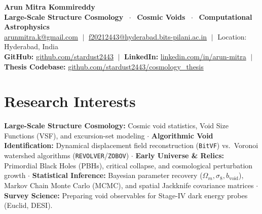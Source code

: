 \documentclass[10pt,a4paper]{article}
\begin{document}
\begin{center}
    {\LARGE\bfseries\color{primarynavy} Arun Mitra Kommireddy} \\[2.5pt]
    {\normalsize\color{secondaryslate}\textbf{Large-Scale Structure Cosmology $\;\cdot\;$ Cosmic Voids $\;\cdot\;$ Computational Astrophysics}} \\[4pt]
    
    {\small
    \href{mailto:arunmitra.k@gmail.com}{arunmitra.k@gmail.com} $\;\vert\;$ 
    \href{mailto:f20212443@hyderabad.bits-pilani.ac.in}{f20212443@hyderabad.bits-pilani.ac.in} $\;\vert\;$ 
    Location: Hyderabad, India
    } \\[1.5pt]
    {\small
    \textbf{GitHub:} \href{https://github.com/stardust2443}{github.com/stardust2443} $\;\vert\;$ 
    \textbf{LinkedIn:} \href{https://linkedin.com/in/arun-mitra}{linkedin.com/in/arun-mitra} $\;\vert\;$ 
    \textbf{Thesis Codebase:} \href{https://github.com/stardust2443/cosmology_thesis}{github.com/stardust2443/cosmology\_thesis}
    }
\end{center}

\vspace{-6pt}

\section{Research Interests}
\textbf{Large-Scale Structure Cosmology:} Cosmic void statistics, Void Size Functions (VSF), and excursion-set modeling $\cdot$ \textbf{Algorithmic Void Identification:} Dynamical displacement field reconstruction (\texttt{BitVF}) vs.\ Voronoi watershed algorithms (\texttt{REVOLVER}/\texttt{ZOBOV}) $\cdot$ \textbf{Early Universe \& Relics:} Primordial Black Holes (PBHs), critical collapse, and cosmological perturbation growth $\cdot$ \textbf{Statistical Inference:} Bayesian parameter recovery ($\Omega_m, \sigma_8, b_{\mathrm{void}}$), Markov Chain Monte Carlo (MCMC), and spatial Jackknife covariance matrices $\cdot$ \textbf{Survey Science:} Preparing void observables for Stage-IV dark energy probes (Euclid, DESI).

\end{document}
